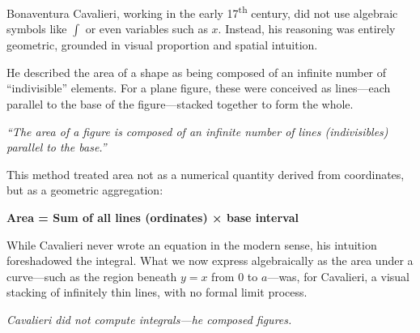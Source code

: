 \begin{tcolorbox}[colback=gray!5!white, colframe=black, title=\textbf{Historical Sidebar: Cavalieri Before the Integral}, fonttitle=\bfseries, arc=1.5mm, boxrule=0.4pt]

    Bonaventura Cavalieri, working in the early 17\textsuperscript{th} century, did not use algebraic symbols like \( \int \) or even variables such as \( x \). Instead, his reasoning was entirely geometric, grounded in visual proportion and spatial intuition.
    
    He described the area of a shape as being composed of an infinite number of “indivisible” elements. For a plane figure, these were conceived as lines—each parallel to the base of the figure—stacked together to form the whole.
    
    \vspace{0.5em}
    \textit{“The area of a figure is composed of an infinite number of lines (indivisibles) parallel to the base.”}
    
    \vspace{0.5em}
    This method treated area not as a numerical quantity derived from coordinates, but as a geometric aggregation:
    \begin{center}
    \textbf{Area = Sum of all lines (ordinates) × base interval}
    \end{center}
    
    While Cavalieri never wrote an equation in the modern sense, his intuition foreshadowed the integral. What we now express algebraically as the area under a curve—such as the region beneath \( y = x \) from \( 0 \) to \( a \)—was, for Cavalieri, a visual stacking of infinitely thin lines, with no formal limit process.
    
    \vspace{0.3em}
    \textit{Cavalieri did not compute integrals—he composed figures.}
\end{tcolorbox}